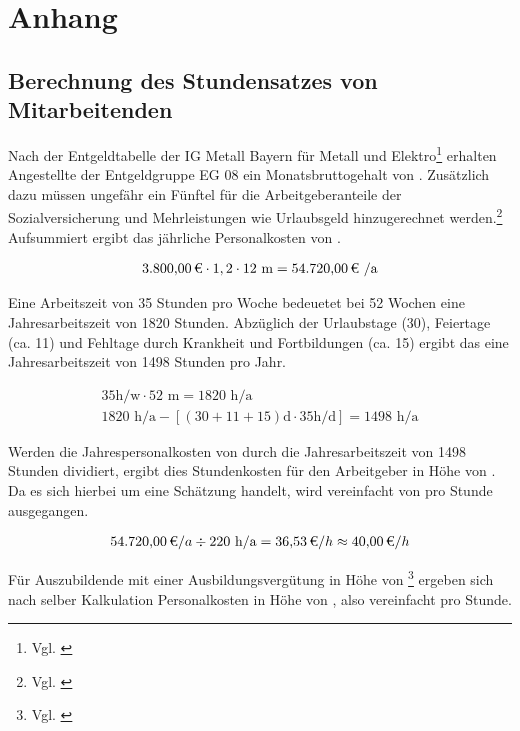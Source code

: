 \section{Anhang}

\subsection{Berechnung des Stundensatzes von Mitarbeitenden}
\label{app:Stundensatz}
Nach der Entgeldtabelle der IG Metall Bayern für Metall und Elektro\footnote{Vgl. \cite{Entgeldtabelle}} erhalten Angestellte der Entgeldgruppe EG 08 ein Monatsbruttogehalt von . Zusätzlich dazu müssen ungefähr ein Fünftel für die Arbeitgeberanteile der Sozialversicherung und Mehrleistungen wie Urlaubsgeld hinzugerechnet werden.\footnote{Vgl. \cite{Personalkosten}} Aufsummiert ergibt das jährliche Personalkosten von .

\begin{eqnarray}
\eur{3.800,00} \cdot 1,2 \cdot 12 \mbox{ m} = \eur{54.720,00} \mbox{ /a}
\end{eqnarray}

Eine Arbeitszeit von 35 Stunden pro Woche bedeuetet bei 52 Wochen eine Jahresarbeitszeit von 1820 Stunden. Abzüglich der Urlaubstage (30), Feiertage (ca. 11) und Fehltage durch Krankheit und Fortbildungen (ca. 15) ergibt das eine Jahresarbeitszeit von 1498 Stunden pro Jahr.

\begin{eqnarray}
35 \mbox{h/w} \cdot 52 \mbox{ m} = 1820 \mbox{ h/a} \\
1820 \mbox{ h/a} - [(30+11+15) \mbox{d} \cdot 35 \mbox{h/d}] = 1498 \mbox{ h/a}
\end{eqnarray}

Werden die Jahrespersonalkosten von  durch die Jahresarbeitszeit von 1498 Stunden dividiert, ergibt dies Stundenkosten für den Arbeitgeber in Höhe von . Da es sich hierbei um eine Schätzung handelt, wird vereinfacht von  pro Stunde ausgegangen.  

\begin{eqnarray}
\eur{54.720,00} /a \div 220 \mbox{ h/a} = \eur{36,53} /h \approx \eur{40,00} /h 
\end{eqnarray}

Für Auszubildende mit einer Ausbildungsvergütung in Höhe von  \footnote{Vgl. \cite{EntgeldtabelleAzubis}} ergeben sich nach selber Kalkulation Personalkosten in Höhe von , also vereinfacht  pro Stunde.

